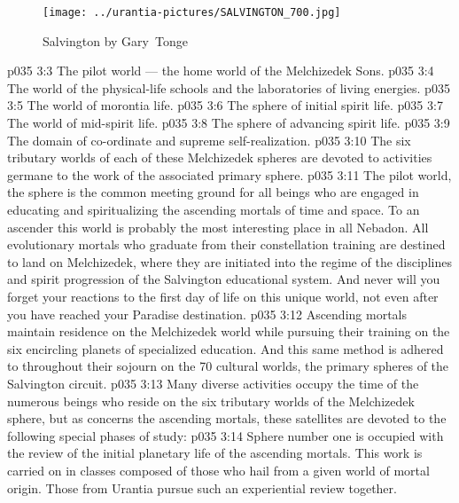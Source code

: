 \begin{figure}[H]
\centering
\texttt{[image: ../urantia-pictures/SALVINGTON\_700.jpg]}
\caption{Salvington by Gary~Tonge}
\end{figure}
\vs p035 3:3 \bibnobreakspace The pilot world --- the home world of the Melchizedek Sons.
\vs p035 3:4 \bibnobreakspace The world of the physical\hyp{}life schools and the laboratories of living energies.
\vs p035 3:5 \bibnobreakspace The world of morontia life.
\vs p035 3:6 \bibnobreakspace The sphere of initial spirit life.
\vs p035 3:7 \bibnobreakspace The world of mid\hyp{}spirit life.
\vs p035 3:8 \bibnobreakspace The sphere of advancing spirit life.
\vs p035 3:9 \bibnobreakspace The domain of co\hyp{}ordinate and supreme self\hyp{}realization.
\vs p035 3:10 \pc The six tributary worlds of each of these Melchizedek spheres are devoted to activities germane to the work of the associated primary sphere.
\vs p035 3:11 \pc The pilot world, the sphere  is the common meeting ground for all beings who are engaged in educating and spiritualizing the ascending mortals of time and space. To an ascender this world is probably the most interesting place in all Nebadon. All evolutionary mortals who graduate from their constellation training are destined to land on Melchizedek, where they are initiated into the regime of the disciplines and spirit progression of the Salvington educational system. And never will you forget your reactions to the first day of life on this unique world, not even after you have reached your Paradise destination.
\vs p035 3:12 Ascending mortals maintain residence on the Melchizedek world while pursuing their training on the six encircling planets of specialized education. And this same method is adhered to throughout their sojourn on the 70 cultural worlds, the primary spheres of the Salvington circuit.
\vs p035 3:13 \pc Many diverse activities occupy the time of the numerous beings who reside on the six tributary worlds of the Melchizedek sphere, but as concerns the ascending mortals, these satellites are devoted to the following special phases of study:
\vs p035 3:14 \bibnobreakspace Sphere number one is occupied with the review of the initial planetary life of the ascending mortals. This work is carried on in classes composed of those who hail from a given world of mortal origin. Those from Urantia pursue such an experiential review together.
